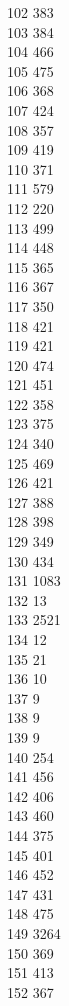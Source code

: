{ 102	383 \\
 103	384 \\
 104	466 \\
 105	475 \\
 106	368 \\
 107	424 \\
 108	357 \\
 109	419 \\
 110	371 \\
 111	579 \\
 112	220 \\
 113	499 \\
 114	448 \\
 115	365 \\
 116	367 \\
 117	350 \\
 118	421 \\
 119	421 \\
 120	474 \\
 121	451 \\
 122	358 \\
 123	375 \\
 124	340 \\
 125	469 \\
 126	421 \\
 127	388 \\
 128	398 \\
 129	349 \\
 130	434 \\
 131	1083 \\
 132	13 \\
 133	2521 \\
 134	12 \\
 135	21 \\
 136	10 \\
 137	9 \\
 138	9 \\
 139	9 \\
 140	254 \\
 141	456 \\
 142	406 \\
 143	460 \\
 144	375 \\
 145	401 \\
 146	452 \\
 147	431 \\
 148	475 \\
 149	3264 \\
 150	369 \\
 151	413 \\
 152	367 \\
}
